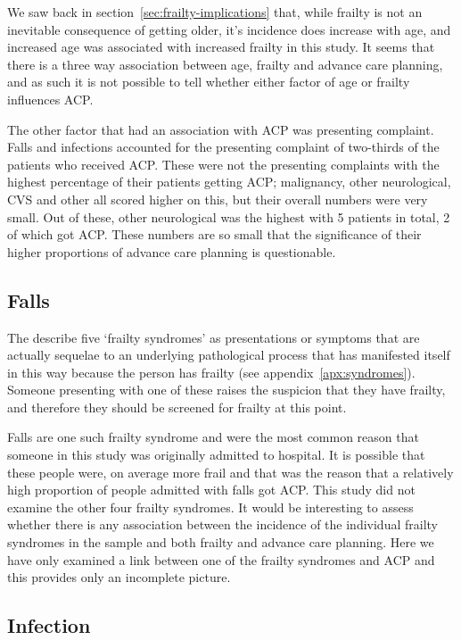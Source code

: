 \documentclass
[
	12pt,
	a4paper,
	oneside,
]{report}
\begin{document}
We saw back in 
section~\ref{sec:frailty-implications} that, while frailty is not an
inevitable consequence of getting older, it's incidence does increase with age,
and increased age was associated with increased frailty in this study. It seems
that there is a three way association between age, frailty and advance care 
planning, and as such it is not possible to tell whether either factor of 
age or frailty influences ACP. 

The other factor that had an association with ACP was presenting complaint.
Falls and infections accounted for the presenting complaint of two-thirds
of the patients who received ACP. These were not the presenting complaints
with the highest percentage of their patients getting ACP; malignancy, other
neurological, CVS and other all scored higher on this, but their overall numbers
were very small. Out of these, other neurological was the highest with 5 patients in 
total, 2 of which got ACP. These numbers are so small that the significance
of their higher proportions of advance care planning is questionable. 

\subsection{Falls}

The \textcite{bgs:14} describe five `frailty syndromes' as presentations or 
symptoms that are actually sequelae to an underlying pathological process
that has manifested itself in this way because the person has frailty
(see appendix~\ref{apx:syndromes}).
Someone presenting with one of these raises the suspicion that they have frailty,
and therefore they should be screened for frailty at this point.

Falls are one such frailty syndrome and were the most common reason that someone
in this study was originally admitted to hospital. It is possible that these
people were, on average more frail and that was the reason that a 
relatively high proportion of people admitted with falls got ACP.
This study did not examine the other four frailty syndromes. 
It would be interesting to assess whether there is 
any association between the incidence of the individual frailty syndromes 
in the sample and both frailty and advance care planning. Here we have only
examined a link between one of the frailty syndromes and ACP and this
provides only an incomplete picture.  

\subsection{Infection}
\end{document}
